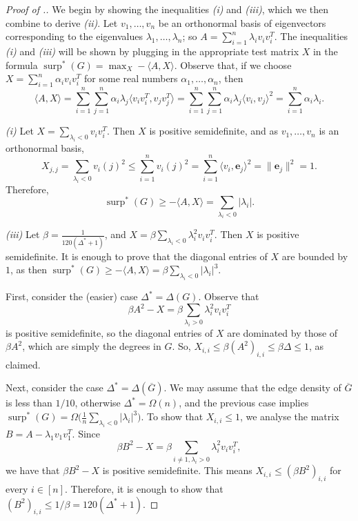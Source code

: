 \documentclass[11pt]{article}
\theoremstyle{plain}
\theoremstyle{definition}
\DeclareMathOperator{\surp}{surp}
\begin{document}
\begin{proof}[Proof of .]
We begin by showing the inequalities \textit{(i)} and \textit{(iii)}, which we then combine to derive \textit{(ii)}. 
Let $v_1,\dots,v_n$ be an orthonormal basis of eigenvectors corresponding to the eigenvalues $\lambda_1,\dots,\lambda_n$; so $A = \sum_{i=1}^n \lambda_i v_i v_i^T$.
The inequalities \textit{(i)} and \textit{(iii)} will be shown by plugging in the appropriate test matrix $X$ in the formula $\surp^*(G)= \max_X -\langle A, X\rangle$. Observe that, if we choose $X=\sum_{i=1}^n\alpha_i v_iv_i^T$ for some real numbers $\alpha_1,\dots,\alpha_n$, then
$$\langle A,X\rangle=\sum_{i=1}^n\sum_{j=1}^n\alpha_i\lambda_j \langle v_iv_i^T,v_jv_j^T\rangle=\sum_{i=1}^n\sum_{j=1}^n\alpha_i\lambda_j \langle v_i,v_j\rangle^2=\sum_{i=1}^n\alpha_i\lambda_i.$$

\textit{(i)} Let $X=\sum_{\lambda_i<0} v_iv_i^T$. Then $X$ is positive semidefinite, and as $v_1,\dots,v_n$ is an orthonormal basis,  $$X_{j,j}=\sum_{\lambda_i<0}v_i(j)^2\leq\sum_{i=1}^n v_i(j)^2=\sum_{i=1}^n \langle v_i, \mathbf{e}_j\rangle^2= \|\mathbf{e}_j\|^2=1.$$ Therefore, \[\surp^*(G)\geq -\langle A,X\rangle=\sum_{\lambda_i<0}|\lambda_{i}|.\]

\textit{(iii)} Let $\beta=\frac{1}{120(\Delta^*+1)}$, and $X=\beta\sum_{\lambda_i<0} \lambda_i^2v_iv_i^T$. Then $X$ is positive semidefinite. It is enough to prove that the diagonal entries of $X$ are bounded by $1$, as then $\surp^*(G)\geq -\langle A,X\rangle =\beta\sum_{\lambda_i<0}|\lambda_{i}|^3$. 

First, consider the (easier) case $\Delta^*=\Delta(G)$.
Observe that $$\beta A^2-X=\beta\sum_{\lambda_i>0}\lambda_i^2v_iv_i^T$$ is positive semidefinite, so the diagonal entries of $X$ are dominated by those of $\beta A^2$, which are simply the degrees in $G$.
So, $X_{i,i} \le \beta(A^2)_{i,i}\leq \beta \Delta\leq 1$, as claimed.

Next, consider the case $\Delta^*=\Delta(\overline{G})$. 
We may assume that the edge density of $\overline{G}$ is less than $1/10$, otherwise $\Delta^*=\Omega(n)$, and the previous case implies $\surp^*(G)=\Omega\big(\frac{1}{n}\sum_{\lambda_i<0}|\lambda_i|^3\big)$. 
To show that  $X_{i,i}\leq 1$, we analyse the matrix $B=A-\lambda_1v_1v_1^T$.
Since $$\beta B^2-X=\beta\sum_{i\neq 1,\lambda_i>0}\lambda_i^2v_iv_i^T,$$ we have that $\beta B^2-X$ is positive semidefinite.
This means $X_{i,i} \le (\beta B^2)_{i,i}$ for every $i\in [n]$. Therefore, it is enough to show that $(B^2)_{i,i}\leq 1/\beta=120(\Delta^*+1)$.


\end{proof}
\end{document}
